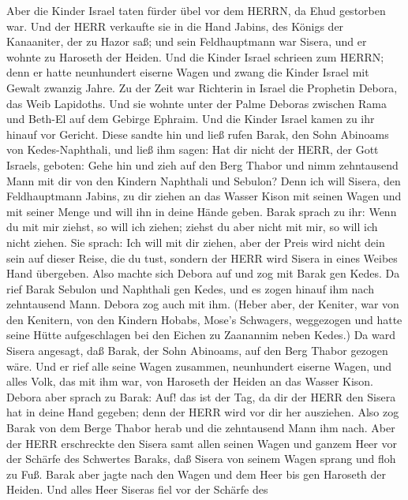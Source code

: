  Aber die Kinder Israel taten fürder übel vor dem HERRN, da
Ehud gestorben war.  Und der HERR verkaufte sie in die Hand
Jabins, des Königs der Kanaaniter, der zu Hazor saß; und sein
Feldhauptmann war Sisera, und er wohnte zu Haroseth der Heiden.
 Und die Kinder Israel schrieen zum HERRN; denn er hatte
neunhundert eiserne Wagen und zwang die Kinder Israel mit Gewalt zwanzig
Jahre.  Zu der Zeit war Richterin in Israel die Prophetin
Debora, das Weib Lapidoths.  Und sie wohnte unter der Palme
Deboras zwischen Rama und Beth-El auf dem Gebirge Ephraim. Und die
Kinder Israel kamen zu ihr hinauf vor Gericht.  Diese sandte
hin und ließ rufen Barak, den Sohn Abinoams von Kedes-Naphthali, und
ließ ihm sagen: Hat dir nicht der HERR, der Gott Israels, geboten: Gehe
hin und zieh auf den Berg Thabor und nimm zehntausend Mann mit dir von
den Kindern Naphthali und Sebulon?  Denn ich will Sisera,
den Feldhauptmann Jabins, zu dir ziehen an das Wasser Kison mit seinen
Wagen und mit seiner Menge und will ihn in deine Hände geben.
 Barak sprach zu ihr: Wenn du mit mir ziehst, so will ich
ziehen; ziehst du aber nicht mit mir, so will ich nicht ziehen.
 Sie sprach: Ich will mit dir ziehen, aber der Preis wird
nicht dein sein auf dieser Reise, die du tust, sondern der HERR wird
Sisera in eines Weibes Hand übergeben. Also machte sich Debora auf und
zog mit Barak gen Kedes.  Da rief Barak Sebulon und
Naphthali gen Kedes, und es zogen hinauf ihm nach zehntausend Mann.
Debora zog auch mit ihm.  (Heber aber, der Keniter, war von
den Kenitern, von den Kindern Hobabs, Mose's Schwagers, weggezogen und
hatte seine Hütte aufgeschlagen bei den Eichen zu Zaanannim neben
Kedes.)  Da ward Sisera angesagt, daß Barak, der Sohn
Abinoams, auf den Berg Thabor gezogen wäre.  Und er rief
alle seine Wagen zusammen, neunhundert eiserne Wagen, und alles Volk,
das mit ihm war, von Haroseth der Heiden an das Wasser Kison.
 Debora aber sprach zu Barak: Auf! das ist der Tag, da dir
der HERR den Sisera hat in deine Hand gegeben; denn der HERR wird vor
dir her ausziehen. Also zog Barak von dem Berge Thabor herab und die
zehntausend Mann ihm nach.  Aber der HERR erschreckte den
Sisera samt allen seinen Wagen und ganzem Heer vor der Schärfe des
Schwertes Baraks, daß Sisera von seinem Wagen sprang und floh zu Fuß.
 Barak aber jagte nach den Wagen und dem Heer bis gen
Haroseth der Heiden. Und alles Heer Siseras fiel vor der Schärfe des
